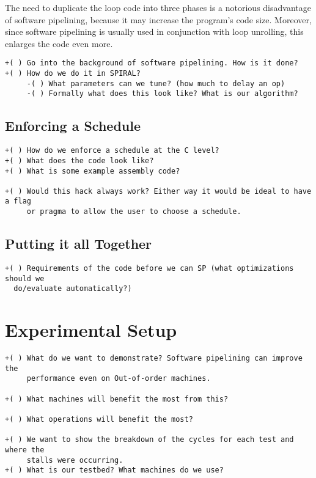 \documentclass[10pt]{article}
\begin{document}
The need to duplicate the loop code into three phases is a notorious disadvantage of software
pipelining, because it may increase the program's code size. Moreover, since software pipelining
is usually used in conjunction with loop unrolling, this enlarges the code even more.

\begin{verbatim}
+( ) Go into the background of software pipelining. How is it done?
+( ) How do we do it in SPIRAL?
     -( ) What parameters can we tune? (how much to delay an op)
     -( ) Formally what does this look like? What is our algorithm?
\end{verbatim}

\subsection{Enforcing a Schedule}
\begin{verbatim}
+( ) How do we enforce a schedule at the C level?
+( ) What does the code look like?
+( ) What is some example assembly code?

+( ) Would this hack always work? Either way it would be ideal to have a flag
     or pragma to allow the user to choose a schedule.

\end{verbatim}


\subsection{Putting it all Together}
\begin{verbatim}
+( ) Requirements of the code before we can SP (what optimizations should we
  do/evaluate automatically?)

\end{verbatim}

\section{Experimental Setup}
\begin{verbatim}
+( ) What do we want to demonstrate? Software pipelining can improve the
     performance even on Out-of-order machines.

+( ) What machines will benefit the most from this?

+( ) What operations will benefit the most?

+( ) We want to show the breakdown of the cycles for each test and where the
     stalls were occurring.
+( ) What is our testbed? What machines do we use?
\end{verbatim}
\end{document}
